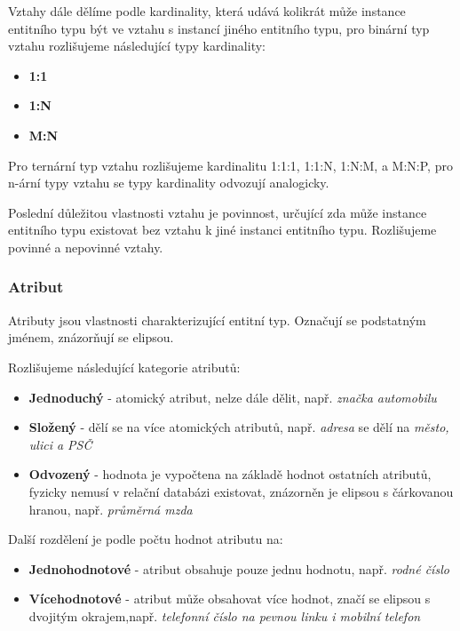 \documentclass[czech,bachelor,public,dept460,male,oneside]{diploma}
\begin{document}
	Vztahy dále dělíme podle kardinality, která udává kolikrát může instance entitního typu být ve vztahu s instancí jiného entitního typu, pro binární typ vztahu  rozlišujeme následující typy kardinality:
	
	\begin{itemize}
		\item \textbf{1:1}
		\item \textbf{1:N}
		\item \textbf{M:N}
	\end{itemize}

	Pro ternární typ vztahu rozlišujeme kardinalitu 1:1:1, 1:1:N, 1:N:M, a M:N:P, pro n-ární typy vztahu se typy kardinality odvozují analogicky.
	
	Poslední důležitou vlastnosti vztahu je povinnost, určující zda může instance entitního typu existovat bez vztahu k jiné instanci entitního typu. Rozlišujeme povinné a nepovinné vztahy.
	
	\subsubsection{Atribut}
	Atributy jsou vlastnosti charakterizující entitní typ. Označují se podstatným jménem, znázorňují se elipsou.
	
	Rozlišujeme následující kategorie atributů:
	
	\begin{itemize}
		\item \textbf{Jednoduchý} - atomický atribut, nelze dále dělit, např. \textit{značka automobilu}
		\item \textbf{Složený} - dělí se na více atomických atributů, např. \textit{adresa} se dělí na \textit{město, ulici a PSČ} 
		\item \textbf{Odvozený} - hodnota je vypočtena na základě hodnot ostatních atributů, fyzicky nemusí v relační databázi existovat, znázorněn je elipsou s čárkovanou hranou, např. \textit{průměrná mzda}
	\end{itemize}

	Další rozdělení je podle počtu hodnot atributu na:
	
	\begin{itemize}
		\item \textbf{Jednohodnotové} - atribut obsahuje pouze jednu hodnotu, např. \textit{rodné číslo}
		\item \textbf{Vícehodnotové} - atribut může obsahovat více hodnot, značí se elipsou s dvojitým okrajem,např. \textit{telefonní číslo na pevnou linku i mobilní telefon}
	\end{itemize}
	
\end{document}
